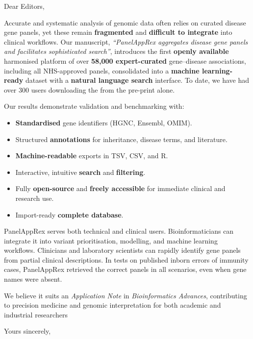 \documentclass[12pt,a4paper]{letter}
\begin{document}
 

\begin{letter}{Dear Editors,}

\opening{}

Accurate and systematic analysis of genomic data often relies on curated disease gene panels, yet these remain \textbf{fragmented} and \textbf{difficult to integrate} into clinical workflows. Our manuscript, \textit{``PanelAppRex aggregates disease gene panels and facilitates sophisticated search''}, introduces the first \textbf{openly available} harmonised platform of over \textbf{58,000 expert-curated} gene–disease associations, including all NHS-approved panels, consolidated into a \textbf{machine learning-ready} dataset with a \textbf{natural language search} interface. To date, we have had over 300 users downloading the from the pre-print alone.


Our results demonstrate validation and benchmarking with:
\begin{itemize}
\item \textbf{Standardised} gene identifiers (HGNC, Ensembl, OMIM).
\item Structured \textbf{annotations} for inheritance, disease terms, and literature.
\item \textbf{Machine-readable} exports in TSV, CSV, and R.
\item Interactive, intuitive \textbf{search} and \textbf{filtering}.
\item Fully \textbf{open-source} and \textbf{freely accessible} for immediate clinical and research use.
\item Import-ready \textbf{complete database}.
\end{itemize}

PanelAppRex serves both technical and clinical users. Bioinformaticians can integrate it into variant prioritisation, modelling, and machine learning workflows. Clinicians and laboratory scientists can rapidly identify gene panels from partial clinical descriptions. In tests on published inborn errors of immunity cases, PanelAppRex retrieved the correct panels in all scenarios, even when gene names were absent.

We believe it suits an \textit{Application Note} in \textit{Bioinformatics Advances}, contributing to precision medicine and genomic interpretation for both academic and industrial researchers

\closing{Yours sincerely,}

\end{letter}
\end{document}

